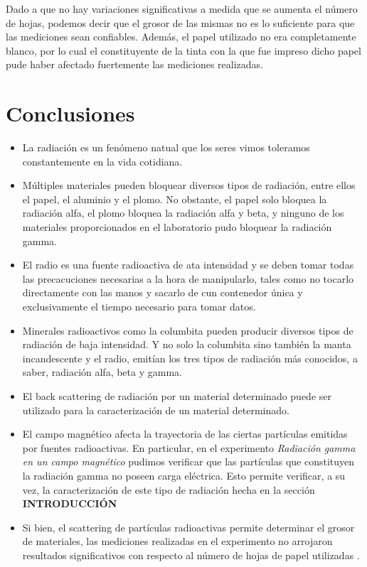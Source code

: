 \documentclass[prb,aps,twocolumn,preprintnumbers,amsmath,amssymb]{revtex4}
\begin{document}
Dado a que no hay variaciones significativas a medida que se aumenta el número de hojas, podemos decir que el grosor de las mismas no es lo suficiente para que las mediciones sean confiables. Además, el papel utilizado no era completamente blanco, por lo cual el constituyente de la tinta con la que fue impreso dicho papel pude haber afectado fuertemente las mediciones realizadas.

\section{\label{conclusiones}Conclusiones}

\begin{itemize}
	\item La radiación es un fenómeno natual que los seres vimos toleramos constantemente en la vida cotidiana.
	
	\item Múltiples materiales pueden bloquear diversos tipos de radiación, entre ellos el papel, el aluminio y el plomo. No obstante, el papel solo bloquea la radiación alfa, el plomo bloquea la radiación alfa y beta, y ninguno de los materiales proporcionados en el laboratorio pudo bloquear la radiación gamma.
	
	\item El radio es una fuente radioactiva de ata intensidad y se deben tomar todas las precacuciones necesarias a la hora de manipularlo, tales como no tocarlo directamente con las manos y sacarlo de cun contenedor única y exclusivamente el tiempo necesario para tomar datos.
	
	\item Minerales radioactivos como la columbita pueden producir diversos tipos de radiación de baja intensidad. Y no solo la columbita sino también la manta incandescente y el radio, emitían los tres tipos de radiación más conocidos, a saber, radiación alfa, beta y gamma.
	
	\item El back scattering de radiación por un material determinado puede ser utilizado para la caracterización de un material determinado.
	
	\item El campo magnético afecta la trayectoria de las ciertas partículas emitidas por fuentes radioactivas. En particular, en el experimento \textit{Radiación gamma en un campo magnético} pudimos verificar que las partículas que constituyen la radiación gamma no poseen carga eléctrica. Esto permite verificar, a su vez, la caracterización de este tipo de radiación hecha en la sección  \textbf{INTRODUCCIÓN} 
	
	\item Si bien, el scattering de partículas radioactivas permite determinar el grosor de materiales, las mediciones realizadas en el experimento no arrojaron resultados significativos con respecto al número de hojas de papel utilizadas .
\end{itemize}
\end{document}
